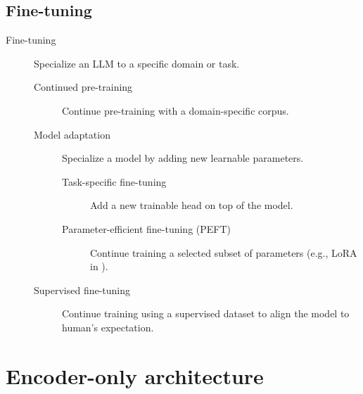 \subsection{Fine-tuning}

\begin{description}
    \item[Fine-tuning] 
        Specialize an LLM to a specific domain or task.

        \begin{description}
            \item[Continued pre-training] 
                Continue pre-training with a domain-specific corpus.

            \item[Model adaptation]
                Specialize a model by adding new learnable parameters.

                \begin{description}
                    \item[Task-specific fine-tuning] 
                        Add a new trainable head on top of the model.

                    \item[Parameter-efficient fine-tuning (PEFT)] 
                        Continue training a selected subset of parameters (e.g., LoRA in ).
                \end{description}

            \item[Supervised fine-tuning] 
                Continue training using a supervised dataset to align the model to human's expectation.
        \end{description}
\end{description}



\section{Encoder-only architecture} \label{sec:mlm}

